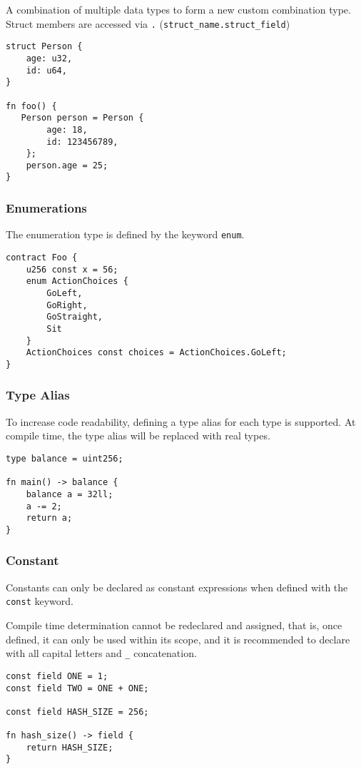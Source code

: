 A combination of multiple data types to form a new custom combination type. Struct members are accessed via \texttt{.} (\texttt{struct\_name.struct\_field})

\begin{lstlisting}
struct Person {
    age: u32,
    id: u64,
}

fn foo() {
   Person person = Person {
        age: 18,
        id: 123456789,
    };
    person.age = 25;
}
\end{lstlisting}

\subsubsection*{Enumerations}

The enumeration type is defined by the keyword \texttt{enum}.

\begin{lstlisting}
contract Foo {
    u256 const x = 56;
    enum ActionChoices {
        GoLeft,
        GoRight,
        GoStraight,
        Sit
    }
    ActionChoices const choices = ActionChoices.GoLeft;
}
\end{lstlisting}


\subsubsection*{Type Alias}

To increase code readability, defining a type alias for each type is supported. At compile time, the type alias will be replaced with real types.

\begin{lstlisting}
type balance = uint256;

fn main() -> balance {
    balance a = 32ll;
    a -= 2;
    return a;
}
\end{lstlisting}

\subsubsection{Constant}

Constants can only be declared as constant expressions when defined with the \texttt{const} keyword.

Compile time determination cannot be redeclared and assigned, that is, once defined, it can only be used within its scope, and it is recommended to declare with all capital letters and \texttt{\_} concatenation. 

\begin{lstlisting}
const field ONE = 1;
const field TWO = ONE + ONE;

const field HASH_SIZE = 256;

fn hash_size() -> field {
    return HASH_SIZE;
}
\end{lstlisting}

